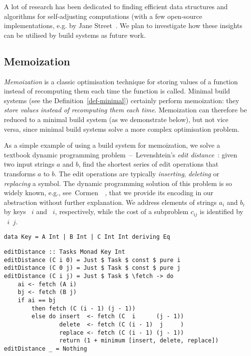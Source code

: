 A lot of research has been dedicated to finding efficient data structures and
algorithms for self-adjusting computations (with a few open-source
implementations, e.g. \Incremental by Jane Street~. We
plan to investigate how these insights can be utilised by build systems as
future work.

\subsection{Memoization}\label{sec-related-memo}

\emph{Memoization} is a classic optimisation technique for storing values of a
function instead of recomputing them each time the function is called. Minimal
build systems (see the Definition~\ref{def-minimal}) certainly perform
memoization: they \emph{store values instead of recomputing them each time}.
Memoization can therefore be reduced to a minimal build system (as we
demonstrate below), but not vice versa, since minimal build systems solve a more
complex optimisation problem.

As a simple example of using a build system for memoization, we solve a textbook
dynamic programming problem~--~Levenshtein's \emph{edit
distance}~\cite{levenshtein1966binary}: given two input strings $a$ and
$b$, find the shortest series of edit operations that transforms $a$
to $b$. The edit operations are typically \emph{inserting}, \emph{deleting} or
\emph{replacing} a symbol. The dynamic programming solution of this problem is
so widely known, e.g., see~Cormen~\etal~, that
we provide its encoding in our  abstraction without further
explanation. We address elements of strings $a_i$ and $b_i$ by keys ~$i$
and ~$i$, respectively, while the cost of a subproblem $c_{ij}$ is
identified by ~$i$~$j$.

\vspace{1mm}
\begin{verbatim}
data Key = A Int | B Int | C Int Int deriving Eq
\end{verbatim}
\vspace{0mm}
\begin{verbatim}
editDistance :: Tasks Monad Key Int
editDistance (C i 0) = Just $ Task $ const $ pure i
editDistance (C 0 j) = Just $ Task $ const $ pure j
editDistance (C i j) = Just $ Task $ \fetch -> do
    ai <- fetch (A i)
    bj <- fetch (B j)
    if ai == bj
        then fetch (C (i - 1) (j - 1))
        else do insert  <- fetch (C  i      (j - 1))
                delete  <- fetch (C (i - 1)  j     )
                replace <- fetch (C (i - 1) (j - 1))
                return (1 + minimum [insert, delete, replace])
editDistance _ = Nothing
\end{verbatim}
\vspace{1mm}

